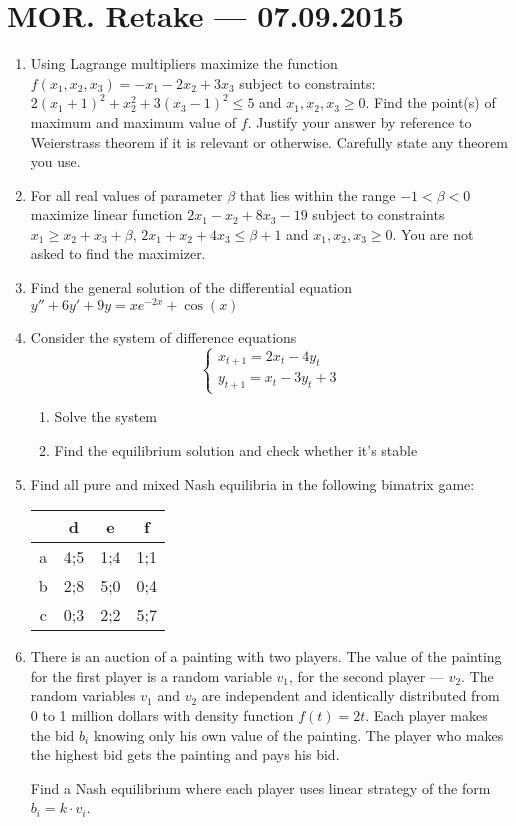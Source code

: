 \documentclass[12pt,a4paper]{article}
\begin{document}
\section*{MOR. Retake --- 07.09.2015}

\pagestyle{empty}

\begin{enumerate}
\item Using Lagrange multipliers maximize  the function $f(x_1,x_2,x_3)=-x_1-2x_2+3x_3$ subject to constraints:   $2(x_1+1)^2+x_2^2+3(x_3-1)^2\leq 5$ and $x_1, x_2, x_3 \geq 0$. Find the point(s) of maximum and maximum value of $f$. Justify your answer by reference to Weierstrass theorem if it is relevant or otherwise. Carefully state any theorem you use.

\item For all real values of parameter $\beta$ that lies within the range $-1<\beta<0$ maximize linear function $2x_1-x_2+8x_3-19$ subject to constraints  $x_1\geq x_2+x_3+\beta$,  $2x_1+x_2+4x_3\leq \beta+1$ and $x_1, x_2, x_3 \geq 0$. You are not asked to find the maximizer.

\item Find the general solution of the differential equation $y''+6y'+9y=xe^{-2x}+\cos(x)$
\item Consider the system of difference equations
$$ 
\left\{ \begin{array}{l}
x_{t+1}=2x_t-4y_t \\
y_{t+1}=x_t-3y_t+3
\end{array} \right.
$$
\begin{enumerate}
\item Solve the system
\item Find the equilibrium solution and check whether it's stable
\end{enumerate}


\item Find all pure and mixed Nash equilibria in the following bimatrix game:


\begin{tabular}{c|ccc}
 & d & e & f \\ 
\hline 
a & 4;5 & 1;4 & 1;1  \\ 
b & 2;8 & 5;0 & 0;4  \\ 
c & 0;3 & 2;2 & 5;7  \\ 
\end{tabular} 


\item There is an auction of a painting with two players. The value of the painting for the first player is a random variable $v_1$, for the second player --- $v_2$. The random variables $v_1$ and $v_2$ are independent and identically distributed from 0 to 1 million dollars with density function $f(t)=2t$. Each player makes the bid $b_i$ knowing only his own value of the painting. The player who makes the highest bid gets the painting and pays his bid. 

Find a Nash equilibrium where each player uses linear strategy of the form $b_i=k\cdot v_i$.


\end{enumerate}
\end{document}
